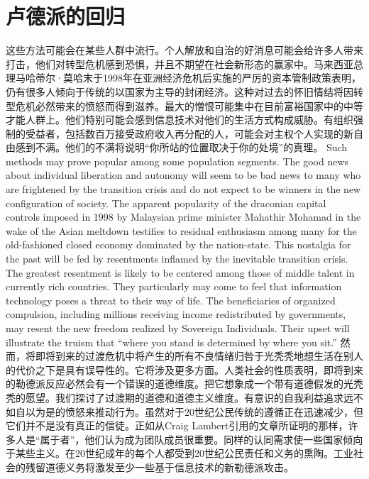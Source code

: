 \section{卢德派的回归}
\begin{paracol}{2}[]
这些方法可能会在某些人群中流行。个人解放和自治的好消息可能会给许多人带来打击，他们对转型危机感到恐惧，并且不期望在社会新形态的赢家中。马来西亚总理马哈蒂尔·莫哈末于1998年在亚洲经济危机后实施的严厉的资本管制政策表明，仍有很多人倾向于传统的以国家为主导的封闭经济。这种对过去的怀旧情结将因转型危机必然带来的愤怒而得到滋养。最大的憎恨可能集中在目前富裕国家中的中等才能人群上。他们特别可能会感到信息技术对他们的生活方式构成威胁。有组织强制的受益者，包括数百万接受政府收入再分配的人，可能会对主权个人实现的新自由感到不满。他们的不满将说明“你所站的位置取决于你的处境”的真理。
\switchcolumn
Such methods may prove popular among some population segments. The good news about individual liberation and autonomy will seem to be bad news to many who are frightened by the transition crisis and do not expect to be winners in the new configuration of society. The apparent popularity of the draconian capital controls imposed in 1998 by Malaysian prime minister Mahathir Mohamad in the wake of the Asian meltdown testifies to residual enthusiasm among many for the old-fashioned closed economy dominated by the nation-state. This nostalgia for the past will be fed by resentments inflamed by the inevitable transition crisis. The greatest resentment is likely to be centered among those of middle talent in currently rich countries. They particularly may come to feel that information technology poses a threat to their way of life. The beneficiaries of organized compulsion, including millions receiving income redistributed by governments, may resent the new freedom realized by Sovereign Individuals. Their upset will illustrate the truism that “where you stand is determined by where you sit.” 
\switchcolumn*
然而，将即将到来的过渡危机中将产生的所有不良情绪归咎于光秃秃地想生活在别人的代价之下是具有误导性的。它将涉及更多方面。人类社会的性质表明，即将到来的勒德派反应必然会有一个错误的道德维度。把它想象成一个带有道德假发的光秃秃的愿望。我们探讨了过渡期的道德和道德主义维度。有意识的自我利益追求远不如自以为是的愤怒来推动行为。虽然对于20世纪公民传统的遵循正在迅速减少，但它们并不是没有真正的信徒。正如从Craig Lambert引用的文章所证明的那样，许多人是“属于者”，他们认为成为团队成员很重要。同样的认同需求使一些国家倾向于某些主义。在20世纪成年的每个人都受到20世纪公民责任和义务的熏陶。工业社会的残留道德义务将激发至少一些基于信息技术的新勒德派攻击。
\switchcolumn

\end{paracol}
